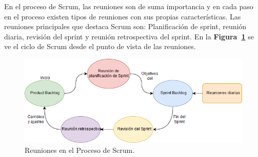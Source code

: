 En el proceso de Scrum, las reuniones son de suma importancia y en cada paso en el proceso existen tipos de reuniones con sus propias características. Las reuniones principales que destaca Scrum son: Planificación de sprint, reunión diaria, revisión del sprint y reunión retrospectiva del sprint. En la \textbf{Figura~\ref{fig: reunionesScrum}} se ve el ciclo de Scrum desde el punto de vista de las reuniones.

\begin{figure}[ht!]
    \includegraphics[width=\textwidth]{Imagenes/Reuniones_Scrum.jpg}
    \caption{\label{fig: reunionesScrum} Reuniones en el Proceso de Scrum.}
\end{figure}

